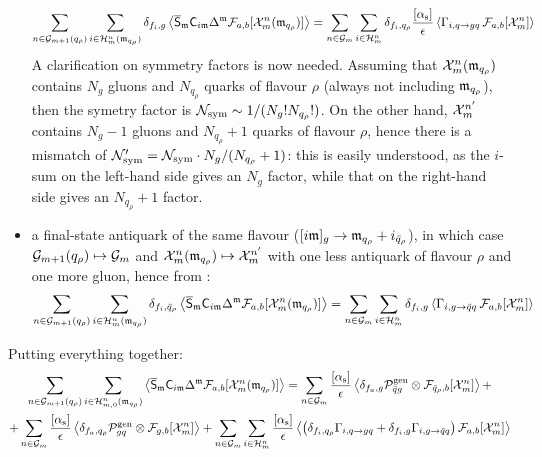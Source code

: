 \begin{itemize}
\begin{equation*}
    \sum_{n \in \mathcal{G}_{m+1}(q_\rho)} \sum_{i \in \mathcal{H}^{n}_{m}(\mathfrak{m}_{q_\rho})} \delta_{f_i , g} \left\langle \overline{\mathsf{S}}_{\mathfrak{m}} \mathsf{C}_{i\mathfrak{m}} \Delta^{\mathfrak{m}} \mathcal{F}_{a,b}[\mathcal{X}^{n}_{m}(\mathfrak{m}_{q_\rho})] \right\rangle = \sum_{n \in \mathcal{G}_m} \sum_{i \in \mathcal{H}^{n}_{m}} \delta_{f_i , q_\rho} \frac{[\alpha_\text{s}]}{\epsilon} \left\langle \Gamma_{i , q \rightarrow gq} \,\mathcal{F}_{a,b}[\mathcal{X}^{n}_{m}] \right\rangle
  \end{equation*}
  A clarification on symmetry factors is now needed. Assuming that $ \mathcal{X}^{n}_{m}(\mathfrak{m}_{q_\rho}) $ contains $ N_g $ gluons and $ N_{q_\rho} $ quarks of flavour $ \rho $ (always not including $ \mathfrak{m}_{q_\rho} $), then the symetry factor is $ \mathcal{N}_\text{sym} \sim 1/(N_g! N_{q_\rho}!) $. On the other hand, $ \mathcal{X}^{n'}_{m} $ contains $ N_g - 1 $ gluons and $ N_{q_\rho} + 1 $ quarks of flavour $ \rho $, hence there is a mismatch of $ \mathcal{N}_\text{sym}' = \mathcal{N}_\text{sym} \cdot N_g / (N_{q_\rho} + 1) $: this is easily understood, as the $ i $-sum on the left-hand side gives an $ N_g $ factor, while that on the right-hand side gives an $ N_{q_\rho} + 1 $ factor.
  \item a final-state antiquark of the same flavour ($ [i\mathfrak{m}]_g \rightarrow \mathfrak{m}_{q_\rho} + i_{\bar{q}_\rho} $), in which case $ \mathcal{G}_{m+1}(q_\rho) \mapsto \mathcal{G}_m $ and $ \mathcal{X}^{n}_{m}(\mathfrak{m}_{q_\rho}) \mapsto \mathcal{X}^{n'}_{m} $ with one less antiquark of flavour $ \rho $ and one more gluon, hence from :
  \begin{equation*}
    \sum_{n \in \mathcal{G}_{m+1}(q_\rho)} \sum_{i \in \mathcal{H}^{n}_{m}(\mathfrak{m}_{q_\rho})} \delta_{f_i , \bar{q}_\rho} \left\langle \overline{\mathsf{S}}_{\mathfrak{m}} \mathsf{C}_{i\mathfrak{m}} \Delta^{\mathfrak{m}} \mathcal{F}_{a,b}[\mathcal{X}^{n}_{m}(\mathfrak{m}_{q_\rho})] \right\rangle = \sum_{n \in \mathcal{G}_m} \sum_{i \in \mathcal{H}^{n}_{m}} \delta_{f_i , g} \left\langle \Gamma_{i , g \rightarrow \bar{q} q} \,\mathcal{F}_{a,b}[\mathcal{X}^{n}_{m}] \right\rangle
  \end{equation*}
\end{itemize}
Putting everything together:
\begin{multline}
  \sum_{n \in \mathcal{G}_{m+1}(q_\rho)} \sum_{i \in \mathcal{H}^{n}_{m,0}(\mathfrak{m}_{q_\rho})} \left\langle \overline{\mathsf{S}}_{\mathfrak{m}} \mathsf{C}_{i\mathfrak{m}} \Delta^{\mathfrak{m}} \mathcal{F}_{a,b}[\mathcal{X}^{n}_{m}(\mathfrak{m}_{q_\rho})] \right\rangle = \sum_{n \in \mathcal{G}_m} \frac{[\alpha_\text{s}]}{\epsilon} \left\langle \delta_{f_a , g} \mathcal{P}^\text{gen}_{\bar{q} g} \otimes \mathcal{F}_{\bar{q}_\rho , b}[\mathcal{X}^{n}_{m}] \right\rangle + \\
  + \sum_{n \in \mathcal{G}_m} \frac{[\alpha_\text{s}]}{\epsilon} \left\langle \delta_{f_a , q_\rho} \mathcal{P}^\text{gen}_{gq} \otimes \mathcal{F}_{g,b}[\mathcal{X}^{n}_{m}] \right\rangle + \sum_{n \in \mathcal{G}_m} \sum_{i \in \mathcal{H}^{n}_{m}} \frac{[\alpha_\text{s}]}{\epsilon} \left\langle \left( \delta_{f_i , q_\rho} \Gamma_{i , q \rightarrow g q} + \delta_{f_i , g} \Gamma_{i , g \rightarrow \bar{q} q} \right) \mathcal{F}_{a,b}[\mathcal{X}^{n}_{m}] \right\rangle
\end{multline}

